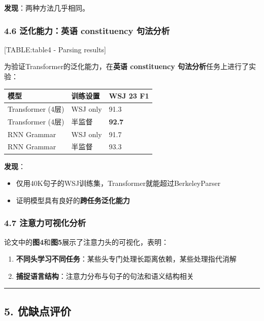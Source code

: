 \documentclass[11pt,a4paper]{article}
\begin{document}
\textbf{发现}：两种方法几乎相同。

\subsubsection*{4.6 泛化能力：英语 constituency 句法分析}

[TABLE:table4 - Parsing results]

为验证Transformer的泛化能力，在\textbf{英语 constituency 句法分析}任务上进行了实验：

\begin{center}
\begin{tabular}{|l|l|l|}
\hline
模型 & 训练设置 & WSJ 23 F1 \\
\hline
Transformer (4层) & WSJ only & 91.3 \\
\hline
Transformer (4层) & 半监督 & \textbf{92.7} \\
\hline
RNN Grammar & WSJ only & 91.7 \\
\hline
RNN Grammar & 半监督 & 93.3 \\
\hline
\end{tabular}
\end{center}

\textbf{发现}：
\begin{itemize}
  \item 仅用40K句子的WSJ训练集，Transformer就能超过BerkeleyParser
  \item 证明模型具有良好的\textbf{跨任务泛化能力}
\end{itemize}

\subsubsection*{4.7 注意力可视化分析}

论文中的\textbf{图4}和\textbf{图5}展示了注意力头的可视化，表明：

\begin{enumerate}
  \item \textbf{不同头学习不同任务}：某些头专门处理长距离依赖，某些处理指代消解
  \item \textbf{捕捉语言结构}：注意力分布与句子的句法和语义结构相关
\end{enumerate}

\vspace{0.5em}\noindent\rule{\textwidth}{0.4pt}\vspace{0.5em}

\subsection*{5. 优缺点评价}
\end{document}
